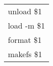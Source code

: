 {\tt
  \begin{tabular}{|l|}
    \hline
    unload \$1   \\
    load -m \$1 \\
    format \$1  \\
    makefs \$1  \\
    \hline
  \end{tabular}
}

